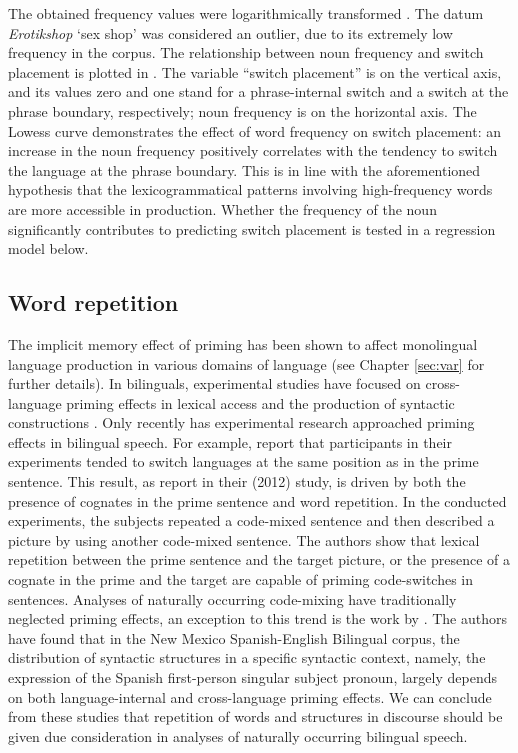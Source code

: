 The obtained frequency values were logarithmically transformed \citep[cf.][31]{baayen-analyzing}. The datum \textit{Erotikshop} `sex shop' was considered an outlier, due to its extremely low frequency in the corpus. The relationship between noun frequency and switch placement is plotted in . The variable “switch placement” is on the vertical axis, and its values zero and one stand for a phrase-internal switch and a switch at the phrase boundary, respectively; noun frequency is on the horizontal axis. The Lowess curve demonstrates the effect of word frequency on switch placement: an increase in the noun frequency positively correlates with the tendency to switch the language at the phrase boundary. This is in line with the aforementioned hypothesis that the lexicogrammatical patterns involving high-frequency words are more accessible in production. Whether the frequency of the noun significantly contributes to predicting switch placement is tested in a regression model below.

\subsection{Word repetition}

The implicit memory effect of priming has been shown to affect monolingual language production in various domains of language (see Chapter \ref{sec:var} for further details). In bilinguals, experimental studies have focused on cross-language priming effects in lexical access \citep{dijkstra-etal98, kroll-stewart94, vanhell-degroot98} and the production of syntactic constructions \citep{loebell-bock03, salamoura-williams06, schoonbaert-etal07}. Only recently has experimental research approached priming effects in bilingual speech. For example, \citep{kootstra-etal10} report that participants in their experiments tended to switch languages at the same position as in the prime sentence. This result, as \citeauthor{kootstra-etal12} report in their (2012) study, is driven by both the presence of cognates in the prime sentence and word repetition. In the conducted experiments, the subjects repeated a code-mixed sentence and then described a picture by using another code-mixed sentence. The authors show that lexical repetition between the prime sentence and the target picture, or the presence of a cognate in the prime and the target are capable of priming code-switches in sentences. Analyses of naturally occurring code-mixing have traditionally neglected priming effects, an exception to this trend is the work by \citep{torres-travis}. The authors have found that in the New Mexico Spanish-English Bilingual corpus, the distribution of syntactic structures in a specific syntactic context, namely, the expression of the Spanish first-person singular subject pronoun, largely depends on both language-internal and cross-language priming effects. We can conclude from these studies that repetition of words and structures in discourse should be given due consideration in analyses of naturally occurring bilingual speech. 

